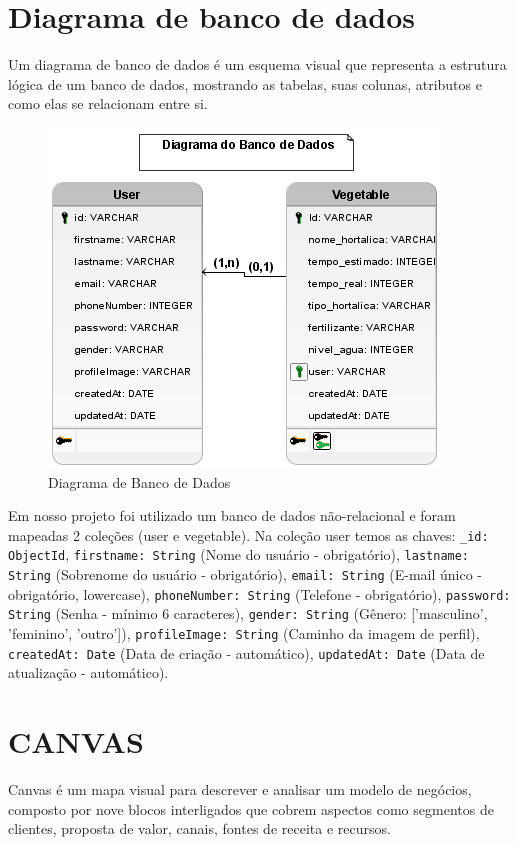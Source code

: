 \documentclass[
  a4paper,
  12pt,
  english,
  brazilian,
]{article}
\begin{document}
\section*{Diagrama de banco de dados}
Um diagrama de banco de dados é um esquema visual que representa a estrutura lógica de um banco de dados, mostrando as tabelas, suas colunas, atributos e como elas se relacionam entre si.

\begin{figure}[H] %
\centering
\caption{Diagrama de Banco de Dados}
\includegraphics[scale=0.6]{Logos/PI - Diagrama de Banco de Dados.png}
\end{figure}

Em nosso projeto foi utilizado um banco de dados não-relacional e foram mapeadas 2 coleções (user e vegetable). Na coleção user temos as chaves: \texttt{\_id: ObjectId}, \texttt{firstname: String} (Nome do usuário - obrigatório), \texttt{lastname: String} (Sobrenome do usuário - obrigatório), \texttt{email: String} (E-mail único - obrigatório, lowercase), \texttt{phoneNumber: String} (Telefone - obrigatório), \texttt{password: String} (Senha - mínimo 6 caracteres), \texttt{gender: String} (Gênero: ['masculino', 'feminino', 'outro']), \texttt{profileImage: String} (Caminho da imagem de perfil), \texttt{createdAt: Date} (Data de criação - automático), \texttt{updatedAt: Date} (Data de atualização - automático).

\section*{CANVAS}
Canvas é um mapa visual para descrever e analisar um modelo de negócios, composto por nove blocos interligados que cobrem aspectos como segmentos de clientes, proposta de valor, canais, fontes de receita e recursos.
\end{document}
